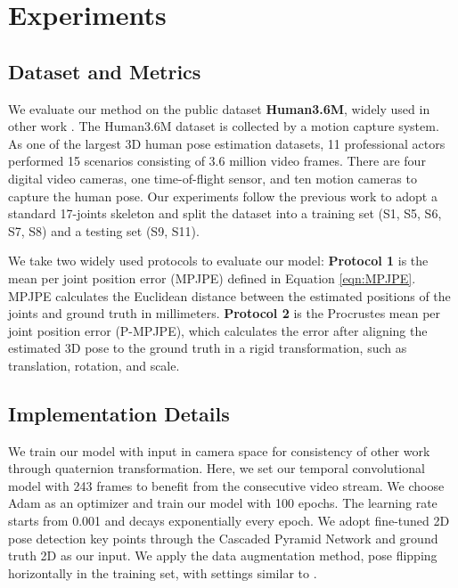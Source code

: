 \documentclass[runningheads]{llncs}
\begin{document}
\section{Experiments}

\subsection{Dataset and Metrics}

We evaluate our method on the public dataset \textbf{Human3.6M}, widely used in other work \cite{h36m_pami}. The Human3.6M dataset is collected by a motion capture system. As one of the largest 3D human pose estimation datasets, 11 professional actors performed 15 scenarios consisting of 3.6 million video frames. There are four digital video cameras, one time-of-flight sensor, and ten motion cameras to capture the human pose. Our experiments follow the previous work \cite{temporal_convolutions_and_semi_supervised} to adopt a standard 17-joints skeleton and split the dataset into a training set (S1, S5, S6, S7, S8) and a testing set (S9, S11).

We take two widely used protocols to evaluate our model: \textbf{Protocol 1} is the mean per joint position error (MPJPE) defined in Equation \ref{eqn:MPJPE}. MPJPE calculates the Euclidean distance between the estimated positions of the joints and ground truth in millimeters. \textbf{ Protocol 2} is the Procrustes mean per joint position error (P-MPJPE), which calculates the error after aligning the estimated 3D pose to the ground truth in a rigid transformation, such as translation, rotation, and scale.



\subsection{Implementation Details}

We train our model with input in camera space for consistency of other work through quaternion transformation. Here, we set our temporal convolutional model with 243 frames to benefit from the consecutive video stream. We choose Adam \cite{adam} as an optimizer and train our model with 100 epochs. The learning rate starts from 0.001 and decays exponentially every epoch. We adopt fine-tuned 2D pose detection key points through the Cascaded Pyramid Network \cite{CPN} and ground truth 2D as our input. We apply the data augmentation method, pose flipping horizontally in the training set, with settings similar to \cite{temporal_convolutions_and_semi_supervised}.
\end{document}
